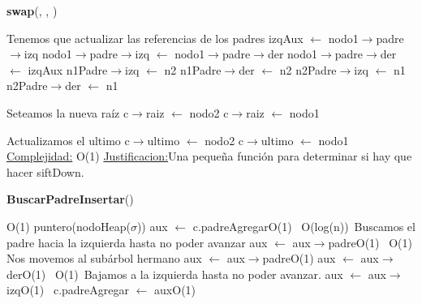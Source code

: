 \begin{Representacion}
\begin{Algoritmos}
\begin{algorithm}[H]{\textbf{swap}(, , )}
\begin{algorithmic}[1]
				\Comment Tenemos que actualizar las referencias de los padres
					\State izqAux $\gets$ nodo1$\to$padre$\to$izq
					\State nodo1$\to$padre$\to$izq $\gets$ nodo1$\to$padre$\to$der
					\State nodo1$\to$padre$\to$der $\gets$ izqAux
				\Else
						\State n1Padre$\to$izq $\gets$ n2
					\EndIf
						\State n1Padre$\to$der $\gets$ n2
					\EndIf
						\State n2Padre$\to$izq $\gets$ n1
					\EndIf
						\State n2Padre$\to$der $\gets$ n1
					\EndIf				
				\EndIf
			\EndIf
			
			\Comment Seteamos la nueva raíz
				\State c$\to$raiz $\gets$ nodo2			
			\Else
					\State c$\to$raiz $\gets$ nodo1
				\EndIf			
			\EndIf
			
			\Comment Actualizamos el ultimo
				\State c$\to$ultimo $\gets$ nodo2
			\Else
					\State c$\to$ultimo $\gets$ nodo1			
				\EndIf
			\EndIf
		\EndIf
		\medskip
		\Statex \underline{Complejidad:} O(1)
			\Statex \underline{Justificacion:}Una pequeña función para determinar si hay que hacer siftDown. 
	\end{algorithmic}
\end{algorithm}


\begin{algorithm}[H]{\textbf{BuscarPadreInsertar}()}
	\begin{algorithmic}[1]
	
		\Comment O(1)
			\State puntero(nodoHeap($\sigma$)) aux $\leftarrow$ c.padreAgregar\Comment O(1)
			\,	
			\Comment O(log(n))\,
				\Comment Buscamos el padre hacia la izquierda hasta no poder avanzar
				\State aux $\leftarrow$ aux$\rightarrow$padre\Comment O(1)		
			\EndWhile
			\,			
			\Comment O(1)\,
				\Comment Nos movemos al subárbol hermano
				\State aux $\leftarrow$ aux$\rightarrow$padre\Comment O(1)
				\State aux $\leftarrow$ aux$\rightarrow$der\Comment O(1)
			\EndIf
			\,			
			\Comment O(1)\,
				\Comment Bajamos a la izquierda hasta no poder avanzar.
				\State aux $\leftarrow$ aux$\rightarrow$izq\Comment O(1)
			\EndWhile
			\,
			\State c.padreAgregar $\leftarrow$ aux\Comment O(1)
		\EndIf
		

\end{algorithmic}
\end{algorithm}
\end{Algoritmos}
\end{Representacion}
